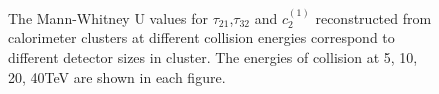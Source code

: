 \documentclass[final,1p,11pt]{elsarticle}
\begin{document}
\begin{figure}
\begin{center}
\end{center}
\caption{The Mann-Whitney U values for $\tau_{21}$,$\tau_{32}$ and $c_2^{(1)}$ reconstructed from calorimeter clusters at different collision energies correspond to different detector sizes in cluster. The energies of collision at 5, 10, 20, 40TeV are shown in each figure.}
\label{fig:cluster_U_summary}
\end{figure}
\end{document}
